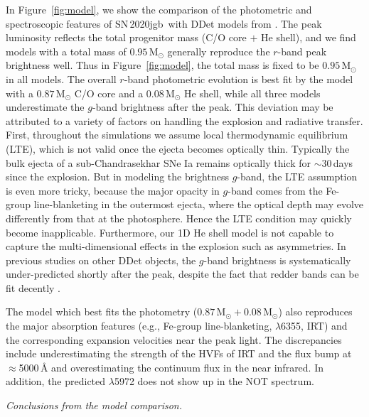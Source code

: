 \documentclass[twocolumn]{aastex631}
\newcommand{\sn}{SN\,2020jgb}
\begin{document}
In Figure~\ref{fig:model}, we show the comparison of the photometric and spectroscopic features of \sn\ with DDet models from \citet{polin_observational_2019}. The peak luminosity reflects the total progenitor mass (C/O core $+$ He shell), and we find models with a total mass of $0.95\,\mathrm{M_\odot}$ generally reproduce the $r$-band peak brightness well. Thus in Figure~\ref{fig:model}, the total mass is fixed to be $0.95\,\mathrm{M_\odot}$ in all models. The overall $r$-band photometric evolution is best fit by the model with a $0.87\,\mathrm{M_\odot}$ C/O core and a $0.08\,\mathrm{M_\odot}$ He shell, while all three models underestimate the $g$-band brightness after the peak. This deviation may be attributed to a variety of factors on handling the explosion and radiative transfer. First, throughout the simulations we assume local thermodynamic equilibrium (LTE), which is not valid once the ejecta becomes optically thin. Typically the bulk ejecta of a sub-Chandrasekhar SNe Ia remains optically thick for $\sim$30\,days since the explosion. But in modeling the brightness $g$-band, the LTE assumption is even more tricky, because the major opacity in $g$-band comes from the Fe-group line-blanketing in the outermost ejecta, where the optical depth may evolve differently from that at the photosphere. Hence the LTE condition may quickly become inapplicable. Furthermore, our 1D He shell model is not capable to capture the multi-dimensional effects in the explosion such as asymmetries. In previous studies on other DDet objects, the $g$-band brightness is systematically under-predicted shortly after the peak, despite the fact that redder bands can be fit decently \citep[e.g.][]{jiang_16jhr_2017,jacobson-galan_16hnk_2020}.

The model which best fits the photometry ($0.87\,\mathrm{M_\odot}+0.08\,\mathrm{M_\odot}$) also reproduces the major absorption features (e.g., Fe-group line-blanketing,  $\lambda$6355,  IRT) and the corresponding expansion velocities near the peak light. The discrepancies include underestimating the strength of the HVFs of  IRT and the flux bump at $\approx$5000\,\r{A} and overestimating the continuum flux in the near infrared. In addition, the predicted  $\lambda$5972 does not show up in the NOT spectrum.

{\it Conclusions from the model comparison.}
\end{document}
